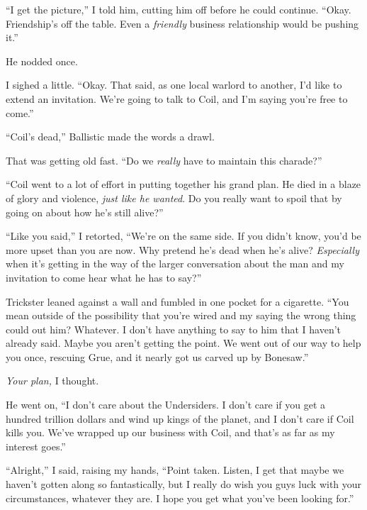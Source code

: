 ``I get the picture,'' I told him, cutting him off before he could continue.  ``Okay.  Friendship's off the table.  Even a \emph{friendly} business relationship would be pushing it.''



He nodded once.



I sighed a little.  ``Okay.  That said, as one local warlord to another, I'd like to extend an invitation.  We're going to talk to Coil, and I'm saying you're free to come.''



``Coil's dead,'' Ballistic made the words a drawl.



That was getting old fast.  ``Do we \emph{really} have to maintain this charade?''



``Coil went to a lot of effort in putting together his grand plan.  He died in a blaze of glory and violence, \emph{just like he wanted}.  Do you really want to spoil that by going on about how he's still alive?''



``Like you said,'' I retorted, ``We're on the same side.  If you didn't know, you'd be more upset than you are now.  Why pretend he's dead when he's alive?  \emph{Especially} when it's getting in the way of the larger conversation about the man and my invitation to come hear what he has to say?''



Trickster leaned against a wall and fumbled in one pocket for a cigarette.  ``You mean outside of the possibility that you're wired and my saying the wrong thing could out him?  Whatever.  I don't have anything to say to him that I haven't already said.  Maybe you aren't getting the point.  We went out of our way to help you once, rescuing Grue, and it nearly got us carved up by Bonesaw.''



\emph{Your plan,} I thought.



He went on, ``I don't care about the Undersiders.  I don't care if you get a hundred trillion dollars and wind up kings of the planet, and I don't care if Coil kills you.  We've wrapped up our business with Coil, and that's as far as my interest goes.''



``Alright,'' I said, raising my hands, ``Point taken.  Listen, I get that maybe we haven't gotten along so fantastically, but I really do wish you guys luck with your circumstances, whatever they are.  I hope you get what you've been looking for.''



